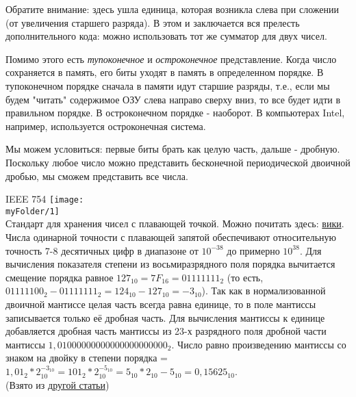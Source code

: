 \begin{lecture}[\lectureSubject]
\begin{lecSection}
\begin{enumerate}
			Обратите внимание: здесь ушла единица, которая возникла слева при сложении (от увеличения старшего разряда). В этом и заключается вся прелесть дополнительного кода: можно использовать тот же сумматор для двух чисел. \\
		\end{enumerate}
		Помимо этого есть \textit{тупоконечное} и \textit{остроконечное} представление.
		Когда число сохраняется в память, его биты уходят в память в определенном порядке. В тупоконечном порядке сначала в памяти идут старшие разряды, т.е., если мы будем "читать" содержимое ОЗУ слева направо сверху вниз, то все будет идти в правильном порядке. В остроконечном порядке - наоборот. В компьютерах Intel, например, используется остроконечная система.
		
	\end{lecSection}
	\begin{lecSection}
		Мы можем условиться: первые биты брать как целую часть, дальше - дробную. Поскольку любое число можно представить бесконечной периодической двоичной дробью, мы сможем представить все числа.
		\begin{lecSubsection}{IEEE 754}
						\texttt{[image: \\myFolder/1]} \\
			Стандарт для хранения чисел с плавающей точкой. Можно почитать здесь: \href{https://ru.wikipedia.org/wiki/IEEE_754-2008}{вики}. \\
			Числа одинарной точности с плавающей запятой обеспечивают относительную точность 7-8 десятичных цифр в диапазоне от $ 10^{-38}$ до примерно $ 10^{38}$.
			Для вычисления показателя степени из восьмиразрядного поля порядка вычитается смещение порядка равное $127_{10} = 7F_{16} = 01111111_2$ (то есть, $01111100_2 - 01111111_2 = 124_{10} - 127_{10} = -3_{10}$). Так как в нормализованной двоичной мантиссе целая часть всегда равна единице, то в поле мантиссы записывается только её дробная часть. Для вычисления мантиссы к единице добавляется дробная часть мантиссы из 23-х разрядного поля дробной части мантиссы $1,01000000000000000000000_2$. Число равно произведению мантиссы со знаком на двойку в степени порядка = $1,01_2*2_{10}^{-3_{10}} = 101_2*2_{10}^{-5_{10}} = 5_{10}*2_{10}-5_{10} = 0,15625_{10}$. \\
			(Взято из \href{https://ru.wikipedia.org/wiki/%D0%A7%D0%B8%D1%81%D0%BB%D0%BE_%D0%BE%D0%B4%D0%B8%D0%BD%D0%B0%D1%80%D0%BD%D0%BE%D0%B9_%D1%82%D0%BE%D1%87%D0%BD%D0%BE%D1%81%D1%82%D0%B8}
				{другой статьи})
		\end{lecSubsection}

\end{lecSection}
\end{lecture}
